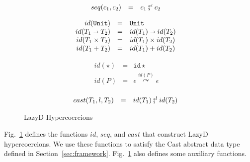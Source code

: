 \documentclass[acmsmall,review]{acmart}\settopmatter{printfolios=true,printccs=false,printacmref=false}
\newcommand{\figref}[1]{Fig.~\ref{#1}}
\newcommand{\funrule}[3]{#1 &=& #2 & #3\\}
\newcommand{\plus}[0]{+}
\newcommand{\lazyD}{Lazy\;D}
\newcommand{\POOunit}[0]{\mathtt{Unit}}
\newcommand{\POOfun}[2]{#1 \shortrightarrow #2}
\newcommand{\POOprod}[2]{#1 \times #2}
\newcommand{\POOsum}[2]{#1 \plus #2}
\newcommand{\hyperCoercionI}[0]{\mathtt{id\star}}
\newcommand{\hyperCoercionC}[3]{#1 \overset{#2}{\curvearrowright} #3}
\begin{document}
\begin{figure}
  \[
  \begin{array}{rclr}
  \funrule{seq(c_1,c_2)}{
    c_1 \fatsemi^\epsilon c_2
  }{}
  \end{array}
  \]
  
  \[
  \begin{array}{rclr}
  \funrule{id(\POOunit)}{\POOunit}{}
  \funrule{id(\POOfun{T_1}{T_2})}{
    \POOfun{id(T_1)}{id(T_2)}
  }{}
  \funrule{id(\POOprod{T_1}{T_2})}{
    \POOprod{id(T_1)}{id(T_2)}
  }{}
  \funrule{id(\POOsum{T_1}{T_2})}{
    \POOsum{id(T_1)}{id(T_2)}
  }{}
  \end{array}
  \]
  
  \[
  \begin{array}{rclr}
  \funrule{id(\star)}{
    \hyperCoercionI
  }{}
  \funrule{id(P)}{
    \hyperCoercionC{\epsilon}{id(P)}{\epsilon}
  }{}
  \end{array}
  \]
  
  \[
  \begin{array}{rclr}
  \funrule{cast(T_1,l,T_2)}{
    id(T_1) \fatsemi^l id(T_2)
  }{}
  \end{array}
  \]
  \caption{\lazyD{} Hypercoercions}
  \label{fig:HC-D}
\end{figure}

\figref{fig:HC-D} defines the functions $id$, $seq$, and $cast$ that construct
\lazyD{} hypercoercions. We use these functions to satisfy the Cast abstract
data type defined in Section~\ref{sec:framework}. \figref{fig:HC-D} also defines
some auxiliary functions.
\end{document}
